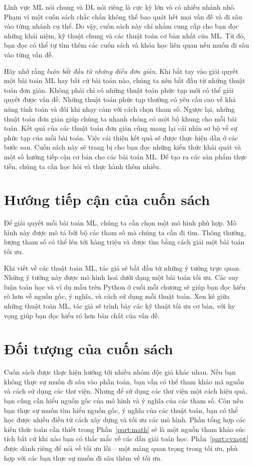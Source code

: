 Lĩnh vực ML nói chung và DL nói riêng là cực kỳ lớn và có nhiều nhánh nhỏ. Phạm vi
một cuốn sách chắc chắn không thể bao quát hết mọi vấn đề và đi sâu vào từng
nhánh cụ thể. Do vậy, cuốn sách này chỉ nhằm cung cấp cho bạn đọc những
khái niệm, kỹ thuật chung và các thuật toán cơ bản nhất của ML. Từ đó, bạn đọc
có thể tự tìm thêm các cuốn sách và khóa học liên quan nếu muốn đi sâu vào từng
vấn đề.



Hãy nhớ rằng \textit{luôn bắt đầu từ những điều đơn giản}. Khi bắt tay vào giải
quyết một bài toán ML hay bất cứ bài toán nào, chúng ta nên bắt đầu từ những
thuật toán đơn giản. Không phải chỉ có những thuật toán phức tạp mới có thể
giải quyết được vấn đề. Những thuật toán phức tạp thường có yêu cầu cao về khả
năng tính toán và đôi khi nhạy cảm với cách chọn tham số. Ngược lại, những
thuật toán đơn giản giúp chúng ta nhanh chóng có một bộ khung cho mỗi bài
toán. Kết quả của các thuật toán đơn giản cũng mang lại cái nhìn sơ bộ về sự
phức tạp của mỗi bài toán. Việc cải thiện kết quả sẽ được thực hiện dần ở các
bước sau. Cuốn sách này sẽ trang bị cho bạn đọc những kiến thức khái quát và một
số hướng tiếp cận cơ bản cho các bài toán ML. Để tạo ra các sản phẩm thực tiễn,
chúng ta cần học hỏi và thực hành thêm nhiều.


\section{Hướng tiếp cận của cuốn sách}

Để giải quyết mỗi bài toán ML, chúng ta cần chọn một mô hình phù hợp. Mô hình
này được mô tả bởi bộ các tham số mà chúng ta cần đi tìm. Thông thường, lượng
tham số có thể lên tới hàng triệu và được tìm bằng cách giải một bài toán tối
ưu.

Khi viết về các thuật toán ML, tác giả sẽ bắt đầu từ những ý tưởng trực quan.
Những ý tưởng này được mô hình hoá dưới dạng một bài toán tối ưu. Các suy luận
toán học và ví dụ mẫu trên Python ở cuối mỗi chương sẽ giúp bạn đọc hiểu rõ hơn
về nguồn gốc, ý nghĩa, và cách sử dụng mỗi thuật toán. Xen kẽ giữa những thuật
toán ML, tác giả sẽ trình bày các kỹ thuật tối ưu cơ bản, với hy vọng giúp bạn
đọc hiểu rõ hơn bản chất của vấn đề.
\section{Đối tượng của cuốn sách}
Cuốn sách được thực hiện hướng tới nhiều nhóm độc giả khác nhau. Nếu bạn không
thực sự muốn đi sâu vào phần toán, bạn vẫn có thể tham khảo mã nguồn và cách sử
dụng các thư viện. Nhưng để sử dụng các thư viện một cách hiệu quả, bạn cũng cần
hiểu nguồn gốc của mô hình và ý nghĩa của các tham số. Còn nếu bạn thực sự muốn
tìm hiểu nguồn gốc, ý nghĩa của các thuật toán, bạn có thể học được nhiều điều
từ cách xây dựng và tối ưu các mô hình. Phần tổng hợp các kiến thức toán cần
thiết trong Phần~\ref{part:math} sẽ là một nguồn tham khảo súc tích bất cứ khi
nào bạn có thắc mắc về các dẫn giải toán học. Phần~\ref{part:cvxopt} được dành
riêng để nói về tối ưu lồi -- một mảng quan trọng trong tối ưu, phù hợp với các
bạn thực sự muốn đi sâu thêm về tối ưu.


